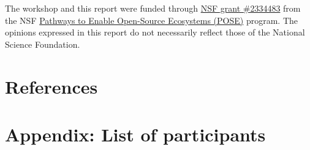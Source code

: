 \documentclass[
  number]{elsarticle}
\begin{document}
The workshop and this report were funded through
\href{https://www.nsf.gov/awardsearch/showAward?AWD_ID=2334483&HistoricalAwards=false}{NSF
grant \#2334483} from the NSF
\href{https://new.nsf.gov/funding/opportunities/pathways-enable-open-source-ecosystems-pose}{Pathways
to Enable Open-Source Ecosystems (POSE)} program. The opinions expressed
in this report do not necessarily reflect those of the National Science
Foundation.

\section{References}\label{references}

\renewcommand{\bibsection}{}


\newpage

\section{Appendix: List of participants}\label{sec-appendix}
\end{document}
